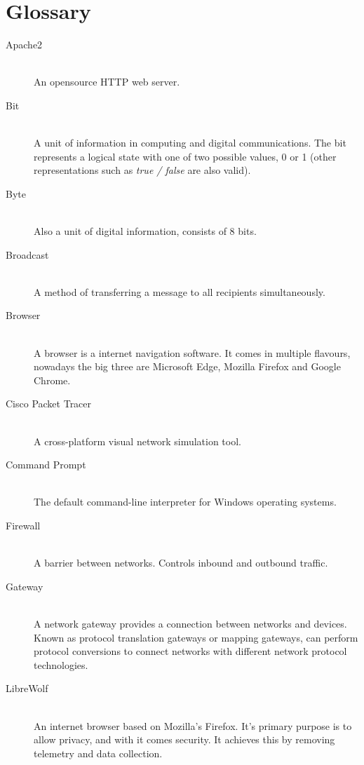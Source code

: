 \documentclass[11pt,a4paper]{report}
\begin{document}
\chapter*{Glossary}

    \begin{description}
        \item[Apache2] \hfill \\
            An opensource HTTP web server.
        \item[Bit] \hfill \\
            A unit of information in computing and digital communications. The bit represents a logical state with one of two possible values, 0 or 1 (other representations such as \textit{true / false} are also valid).
        \item[Byte] \hfill \\
            Also a unit of digital information, consists of 8 bits.
        \item[Broadcast] \hfill \\
            A method of transferring a message to all recipients simultaneously.
        \item[Browser] \hfill \\
            A browser is a internet navigation software. It comes in multiple flavours, nowadays the big three are Microsoft Edge, Mozilla Firefox and Google Chrome.
        \item[Cisco Packet Tracer] \hfill \\
            A cross-platform visual network simulation tool.
        \item[Command Prompt] \hfill \\
            The default command-line interpreter for Windows operating systems.
        \item[Firewall] \hfill \\
            A barrier between networks. Controls inbound and outbound traffic.
        \item[Gateway] \hfill \\
            A network gateway provides a connection between networks and devices. Known as protocol translation gateways or mapping gateways, can perform protocol conversions to connect networks with different network protocol technologies.
        \item[LibreWolf] \hfill \\
            An internet browser based on Mozilla's Firefox. It's primary purpose is to allow privacy, and with it comes security. It achieves this by removing telemetry and data collection.

\end{description}
\end{document}
